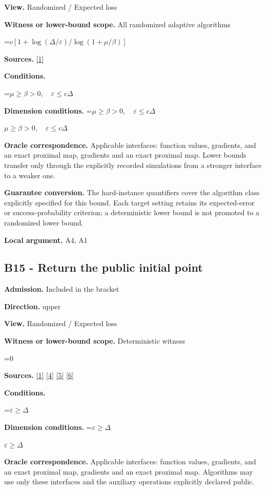 \documentclass[10pt,a4paper]{article}
\newcommand{\AtlasMath}[1]{\par\begingroup\centering\setbox0=\hbox{$\displaystyle #1$}\ifdim\wd0>1.4\linewidth\typeout{ATLAS WIDE FORMULA: \the\wd0}\fi\ifdim\wd0>\linewidth\resizebox{\linewidth}{!}{\box0}\else\box0\fi\par\endgroup}
\newcommand{\AtlasInlineMath}[1]{\begingroup\setbox0=\hbox{$#1$}\ifdim\wd0>.4\linewidth\endgroup\AtlasMath{#1}\else\endgroup$#1$\fi}
\begin{document}
\textbf{View.} Randomized / Expected loss

\textbf{Witness or lower-bound scope.} All randomized adaptive algorithms

\AtlasMath{c[1+\log(\Delta/\varepsilon)/\log(1+\mu/\beta)]}
\textbf{Sources.} \href{https://www.tau.ac.il/~becka/FISTA.pdf}{[1]}

\textbf{Conditions.} 
\AtlasMath{\mu\ge\beta>0,\quad\varepsilon\le c\Delta}


\textbf{Dimension conditions.} \AtlasInlineMath{\mu\ge\beta>0,\quad\varepsilon\le c\Delta}

\textbf{Oracle correspondence.} Applicable interfaces: function values, gradients, and an exact proximal map, gradients and an exact proximal map. Lower bounds transfer only through the explicitly recorded simulations from a stronger interface to a weaker one.

\textbf{Guarantee conversion.} The hard-instance quantifiers cover the algorithm class explicitly specified for this bound. Each target setting retains its expected-error or success-probability criterion; a deterministic lower bound is not promoted to a randomized lower bound.

\textbf{Local argument.} A4, A1

\subsection{B15 - Return the public initial point}
\textbf{Admission.} Included in the bracket

\textbf{Direction.} upper

\textbf{View.} Randomized / Expected loss

\textbf{Witness or lower-bound scope.} Deterministic witness

\AtlasMath{0}
\textbf{Sources.} \href{https://www.tau.ac.il/~becka/FISTA.pdf}{[1]} \href{https://arxiv.org/pdf/1405.4980}{[4]} \href{https://www2.isye.gatech.edu/~nemirovs/MOR_AccuracyCertificates.pdf}{[5]} \href{https://arxiv.org/pdf/2609.20701}{[6]}

\textbf{Conditions.} 
\AtlasMath{\varepsilon\ge\Delta}


\textbf{Dimension conditions.} \AtlasInlineMath{\varepsilon\ge\Delta}

\textbf{Oracle correspondence.} Applicable interfaces: function values, gradients, and an exact proximal map, gradients and an exact proximal map. Algorithms may use only these interfaces and the auxiliary operations explicitly declared public.
\end{document}
